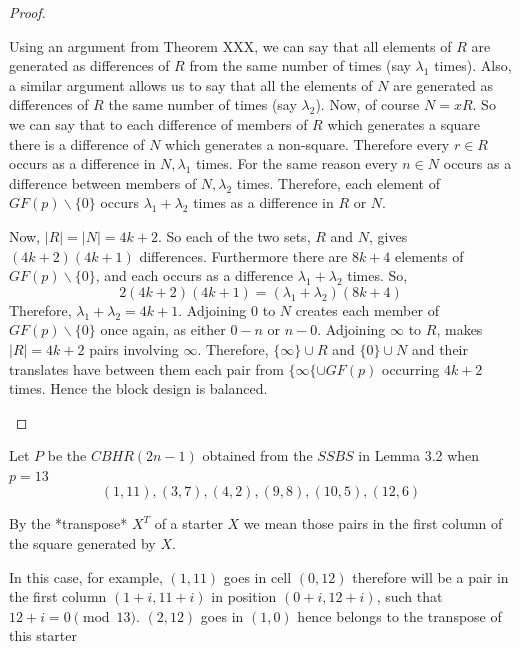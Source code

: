 \documentclass[11pt, a4paper]{book}\usepackage[]{graphicx}\usepackage[]{xcolor}
\newcounter{example}
\begin{document}
\begin{proof}
\begin{enumerate}
{    Using an argument from Theorem XXX, we can say that
    all elements of $R$ are generated as differences of $R$
    from the same number of times (say $\lambda _1$ times).
    Also, a similar argument allows us to say that all the
    elements of $N$ are generated as differences of $R$ the
    same number of times (say $\lambda _2$). Now, of course
    $N = xR$. So we can say that to each difference of
    members of $R$ which generates a square there is a
    difference of $N$ which generates a non-square.
    Therefore every $r \in R$ occurs as a difference in
    $N, \lambda _1$ times. For the same reason every
    $n \in N$ occurs as a difference between members of
    $N, \lambda _2$ times. Therefore, each element of
    $GF(p) \backslash \{0\}$ occurs $\lambda _1 + \lambda _2$
    times as a difference in $R$ or $N$.
    
    Now, $|R| = |N| = 4k + 2$. So each of the two sets, $R$
    and $N$, gives $(4k + 2)(4k + 1)$ differences. Furthermore
    there are $8k + 4$ elements of $GF(p) \backslash \{0\}$,
    and each occurs as a difference
    $\lambda _1 + \lambda _2$ times. So,
    \begin{equation}
    2(4k + 2)(4k + 1) = (\lambda _1 + \lambda _2)(8k + 4)
    \end{equation}
    Therefore, $\lambda _1 + \lambda _2 = 4k + 1$.
    Adjoining 0 to $N$ creates each member of
    $GF(p) \backslash \{0\}$ once again, as either $0-n$ or
    $n-0$.
    Adjoining $\infty$ to $R$, makes $|R| = 4k + 2$ pairs
    involving $\infty$. Therefore, $\{\infty\} \cup R$ and
    $\{0\} \cup N$ and their translates have between them
    each pair from $\{\infty\{ \cup GF(p)$ occurring $4k + 2$
    times. Hence the block design is balanced.}
\end{enumerate}
\end{proof}

\begin{example}
Let $P$ be the $CBHR(2n - 1)$ obtained from the $SSBS$ in
Lemma 3.2 when $p = 13$
\begin{equation}
  (1, 11), (3, 7), (4, 2), (9, 8), (10, 5), (12, 6)
\end{equation}
\end{example}

By the *transpose* $X^T$ of a starter $X$ we mean those
pairs in the first column of the square generated by $X$.

In this case, for example, $(1, 11)$ goes in cell $(0, 12)$
therefore will be a pair in the first column
$(1 + i, 11 + i)$ in position $(0 + i, 12 + i)$, such that
$12 + i = 0\pmod{13}$. $(2, 12)$ goes in $(1, 0)$ hence
belongs to the transpose of this starter
\end{document}
